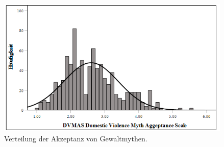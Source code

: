 \begin{figure}[htb]
    \centering
        \includegraphics[width=0.8\linewidth]{Histogramm - DVMAS.png}
        \caption[Histogramm DVMAS]{Verteilung der Akzeptanz von Gewaltmythen.}
        \label{Histogramm DVMAS}
\end{figure}

